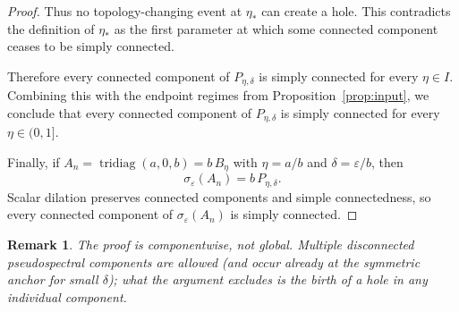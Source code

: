 \documentclass[11pt]{article}
\newtheorem{remark}[theorem]{Remark}
\begin{document}
\begin{proof}
\smallskip

Thus no topology-changing event at \(\eta_*\) can create a hole. This contradicts the definition of \(\eta_*\) as the first parameter at which some connected component ceases to be simply connected.

Therefore every connected component of \(P_{\eta,\delta}\) is simply connected for every \(\eta\in I\). Combining this with the endpoint regimes from Proposition~\ref{prop:input}, we conclude that every connected component of \(P_{\eta,\delta}\) is simply connected for every \(\eta\in(0,1]\).

Finally, if \(A_n=\operatorname{tridiag}(a,0,b)=b\,B_\eta\) with \(\eta=a/b\) and \(\delta=\varepsilon/b\), then
\[
\sigma_\varepsilon(A_n)=b\,P_{\eta,\delta}.
\]
Scalar dilation preserves connected components and simple connectedness, so every connected component of \(\sigma_\varepsilon(A_n)\) is simply connected.
\end{proof}

\begin{remark}
The proof is componentwise, not global. Multiple disconnected pseudospectral components are allowed (and occur already at the symmetric anchor for small \(\delta\)); what the argument excludes is the birth of a \emph{hole} in any individual component.
\end{remark}
\end{document}
